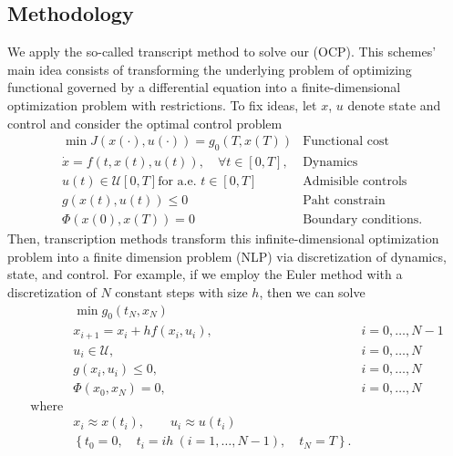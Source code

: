 \subsection{Methodology}
        We apply the so-called transcript method to solve our (OCP).
    This schemes' main idea consists of transforming the underlying problem of
    optimizing functional governed by a differential equation into a
    finite-dimensional optimization problem with restrictions. To fix ideas,
    let $x$, $u$ denote state and control and consider the optimal
    control problem
    \begin{equation*}
        \begin{aligned}
                & \min J(x(\cdot), u(\cdot)) = g_0(T, x(T))
                & \text{Functional cost}
            \\
                & \dot{x} = f(t, x(t), u(t)),
                \quad\forall t \in [0, T],
                & \text{Dynamics}
            \\
                & u(t) \in \mathcal{U}[0, T] \text{for a.e. } t\in [0, T]
                & \text{Admisible controls}
            \\
                & g(x(t), u(t)) \leq 0
                & \text{Paht constrain}
            \\
                & \Phi(x(0), x(T)) = 0
                & \text{Boundary conditions}.
        \end{aligned}
    \end{equation*}
        Then, transcription methods transform this infinite-dimensional
    optimization problem into a finite dimension problem (NLP) via
    discretization of dynamics, state, and control.  For example, if we
    employ the Euler method with a discretization of $N$ constant steps with
    size $h$, then we can solve
    \begin{equation}
        \label{eqn:nlp}
        \begin{aligned}
                & \min g_0(t_N, x_N)
            \\
                &
                    x_{i+1} = x_i + h f(x_i, u_i),
                &
                    i = 0, \dots, N - 1
            \\
                &
                    u_i \in \mathcal{U},
                &
                    i = 0, \dots, N
            \\
                &
                    g(x_i, u_i) \leq 0,
                &
                    i = 0, \dots, N
            \\
                &
                    \Phi(x_0, x_N) = 0,
                &
                    i = 0, \dots, N
            \\
            \text{where} &
            \\
                &
            x_i \approx x(t_i),
            \qquad
            u_i \approx u(t_i)
            \\
            &
            \left\{
            t_0 = 0,\quad
            t_i = i h \ (i=1,\dots, N-1),\quad
            t_N = T
            \right\}.
        \end{aligned}
    \end{equation}
